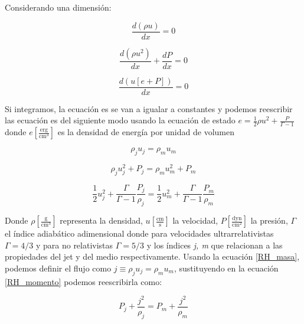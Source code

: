 \documentclass[12pt,a4paper]{book}
\begin{document}
Considerando una dimensión:

\begin{equation}
\dfrac{d \left( \rho u \right)}{d x} = 0
\end{equation}

\begin{equation}
\dfrac{d \left( \rho u^2 \right)}{d x}+ \dfrac{d P}{d x}=0
\end{equation}

\begin{equation}
\dfrac{d \left( u\left[e +P \right] \right)}{d x} = 0
\end{equation}

Si integramos, la ecuación  es se van a igualar a constantes y podemos reescribir las ecuación  es del siguiente modo usando la ecuación de estado $e = \frac{1}{2} \rho u^2 + \frac{P}{\Gamma-1}$ donde $e \left[\frac{\mathrm{erg}}{\mathrm{cm^3}}\right]$ 
es la densidad de energía por unidad de volumen

\begin{equation}\label{RH_masa}
\rho_j u_j = \rho_m u_m
\end{equation}

\begin{equation}\label{RH_momento}
\rho_j u_{j}^{2}+P_j = \rho_m u_{m}^{2}+P_m
\end{equation}

\begin{equation}\label{RH_Energia}
\frac{1}{2} u_{j}^{2}+ \frac{\Gamma}{\Gamma-1} \frac{P_{j}}{\rho_{j}} =
 \frac{1}{2} u_{m}^{2}+ \frac{\Gamma}{\Gamma-1} \frac{P_{m}}{\rho_{m}}
\end{equation}

Donde $\rho \left[\frac{\mathrm{g}}{\mathrm{cm}^3}\right]$ representa la densidad, $u \left[\frac{\mathrm{cm}}{\mathrm{s} }\right]$ la velocidad,  $P \left[\frac{\mathrm{dyn}}{\mathrm{cm}^2} \right]$ la presión, $\Gamma$ el índice adiabático adimensional donde para velocidades ultrarrelativistas $\Gamma = 4/3$ y para no relativistas $\Gamma = 5/3$ y los índices \textit{j, m} que  relacionan a las propiedades del jet y del medio respectivamente. Usando la ecuación   \ref{RH_masa}, podemos definir el flujo como $j \equiv \rho_j u_j = \rho_m u_m$, sustituyendo en la ecuación \ref{RH_momento} podemos reescribirla como:

\begin{equation}\label{RH_momento_j}
P_{j}+\frac{j^2}{\rho_{j}}=P_{m}+\frac{j^2}{\rho_{m}}
\end{equation}
\end{document}
